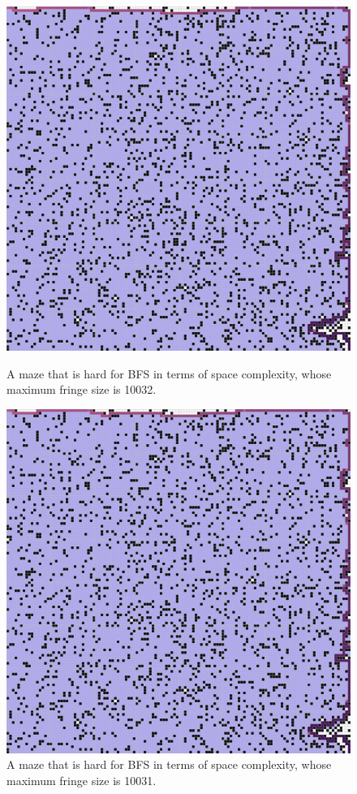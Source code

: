 \documentclass[letter]{article}
\begin{document}
\begin{enumerate}[resume]
\begin{enumerate}
\begin{enumerate}
\begin{figure}
					\includegraphics[width=\textwidth]{../pics/df/10032.png}
					\caption{\label{fig:df2}A maze that is hard for BFS in terms of space complexity, whose maximum fringe size is 10032. }
					\endminipage\hfill
					\includegraphics[width=\textwidth]{../pics/df/10031.png}
					\caption{\label{fig:df3} A maze that is hard for BFS in terms of space complexity, whose maximum fringe size is 10031. }
					\endminipage
					\endminipage 
				\end{figure}
				

\end{enumerate}
\end{enumerate}
\end{enumerate}
\end{document}
